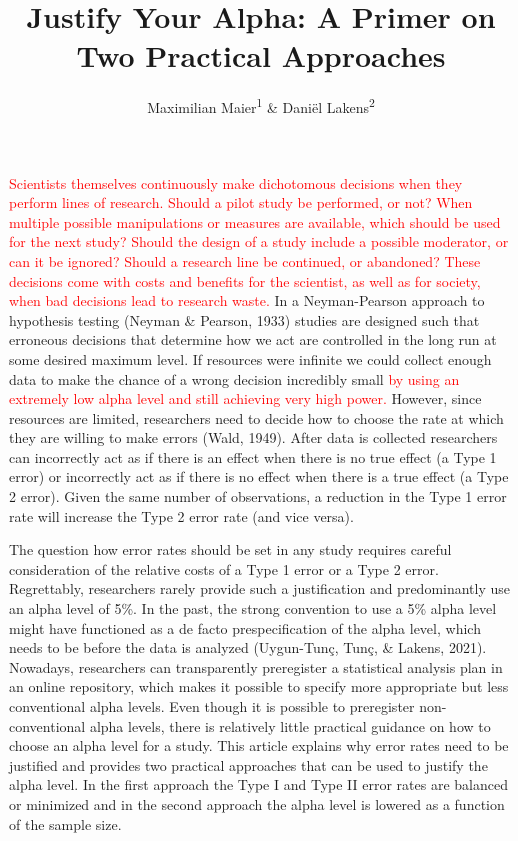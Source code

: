 \documentclass[
  english,
  ,man, a4paper,floatsintext]{apa6}
\title{Justify Your Alpha: A Primer on Two Practical Approaches}
\author{Maximilian Maier\textsuperscript{1} \& Daniël Lakens\textsuperscript{2}}
\date{}
\affiliation{\vspace{0.5cm}\textsuperscript{1} University of Amsterdam, The Netherlands\\\textsuperscript{2} Eindhoven University of Technology, The Netherlands}
\begin{document}
\maketitle

\textcolor{red}{Scientists themselves continuously make dichotomous decisions when they perform lines of research. Should a pilot study be performed, or not? When multiple possible manipulations or measures are available, which should be used for the next study? Should the design of a study include a possible moderator, or can it be ignored? Should a research line be continued, or abandoned? These decisions come with costs and benefits for the scientist, as well as for society, when bad decisions lead to research waste.} In a Neyman-Pearson approach to hypothesis testing (Neyman \& Pearson, 1933) studies are designed such that erroneous decisions that determine how we act are controlled in the long run at some desired maximum level. If resources were infinite we could collect enough data to make the chance of a wrong decision incredibly small \textcolor{red}{by using an extremely low alpha level and still achieving very high power.} However, since resources are limited, researchers need to decide how to choose the rate at which they are willing to make errors (Wald, 1949). After data is collected researchers can incorrectly act as if there is an effect when there is no true effect (a Type 1 error) or incorrectly act as if there is no effect when there is a true effect (a Type 2 error). Given the same number of observations, a reduction in the Type 1 error rate will increase the Type 2 error rate (and vice versa).

The question how error rates should be set in any study requires careful consideration of the relative costs of a Type 1 error or a Type 2 error. Regrettably, researchers rarely provide such a justification and predominantly use an alpha level of 5\%. In the past, the strong convention to use a 5\% alpha level might have functioned as a de facto prespecification of the alpha level, which needs to be before the data is analyzed (Uygun-Tunç, Tunç, \& Lakens, 2021). Nowadays, researchers can transparently preregister a statistical analysis plan in an online repository, which makes it possible to specify more appropriate but less conventional alpha levels. Even though it is possible to preregister non-conventional alpha levels, there is relatively little practical guidance on how to choose an alpha level for a study. This article explains why error rates need to be justified and provides two practical approaches that can be used to justify the alpha level. In the first approach the Type I and Type II error rates are balanced or minimized and in the second approach the alpha level is lowered as a function of the sample size.
\end{document}
